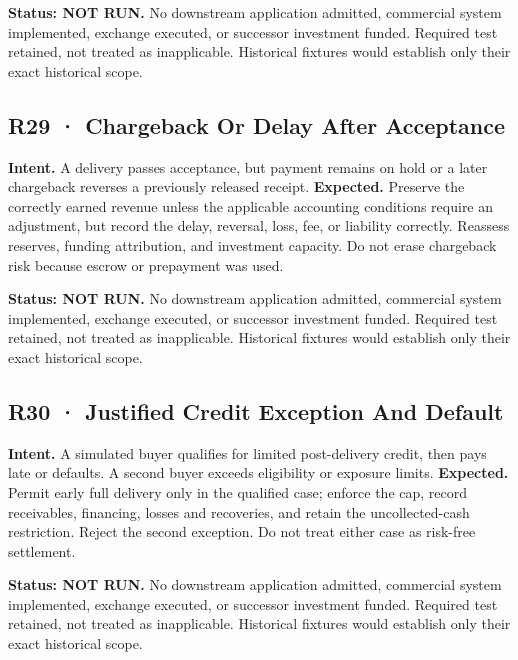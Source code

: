 \documentclass[10pt,letterpaper]{article}
\begin{document}
\textbf{Status: NOT RUN.} No downstream application admitted, commercial
system implemented, exchange executed, or successor investment funded.
Required test retained, not treated as inapplicable. Historical fixtures
would establish only their exact historical scope.

\hypertarget{r29-chargeback-or-delay-after-acceptance}{%
\subsection{R29 · Chargeback Or Delay After
Acceptance}\label{r29-chargeback-or-delay-after-acceptance}}

\textbf{Intent.} A delivery passes acceptance, but payment remains on
hold or a later chargeback reverses a previously released receipt.
\textbf{Expected.} Preserve the correctly earned revenue unless the
applicable accounting conditions require an adjustment, but record the
delay, reversal, loss, fee, or liability correctly. Reassess reserves,
funding attribution, and investment capacity. Do not erase chargeback
risk because escrow or prepayment was used.

\textbf{Status: NOT RUN.} No downstream application admitted, commercial
system implemented, exchange executed, or successor investment funded.
Required test retained, not treated as inapplicable. Historical fixtures
would establish only their exact historical scope.

\hypertarget{r30-justified-credit-exception-and-default}{%
\subsection{R30 · Justified Credit Exception And
Default}\label{r30-justified-credit-exception-and-default}}

\textbf{Intent.} A simulated buyer qualifies for limited post-delivery
credit, then pays late or defaults. A second buyer exceeds eligibility
or exposure limits. \textbf{Expected.} Permit early full delivery only
in the qualified case; enforce the cap, record receivables, financing,
losses and recoveries, and retain the uncollected-cash restriction.
Reject the second exception. Do not treat either case as risk-free
settlement.

\textbf{Status: NOT RUN.} No downstream application admitted, commercial
system implemented, exchange executed, or successor investment funded.
Required test retained, not treated as inapplicable. Historical fixtures
would establish only their exact historical scope.
\end{document}
